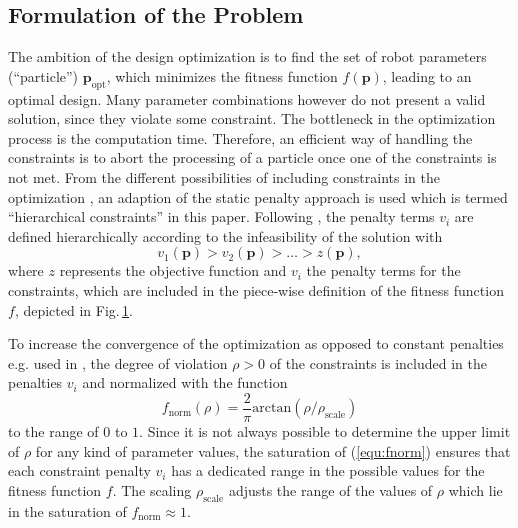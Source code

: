 \documentclass[fleqn,a4paper,10pt]{article}
\newcommand{\bm}[1]{\mathbf{#1}}
\begin{document}
\begin{multicols}{2}
\subsection{Formulation of the Problem}
\label{sec:opt_formulation}

\begin{figure}

\centering

\label{fig:uebersicht}
\end{figure}

The ambition of the design optimization is to find the set of robot parameters (``particle'') $\bm{p}_\mathrm{opt}$, which minimizes the fitness function $f(\bm{p})$, leading to an optimal design.
Many parameter combinations however do not present a valid solution, since they violate some constraint.
The bottleneck in the optimization process is the computation time.
Therefore, an efficient way of handling the constraints is to abort the processing of a particle once one of the constraints is not met.
From the different possibilities of including constraints in the optimization \cite{Jordehi2015}, an adaption of the static penalty approach is used which is termed  ``hierarchical constraints'' in this paper.
Following \cite{Ramirez2018}, the penalty terms $v_i$ are defined hierarchically according to the infeasibility of the solution with
%
\begin{equation}
v_1(\bm{p})>v_2(\bm{p})>\dots>z(\bm{p}),
\end{equation}
%
where $z$ represents the objective function and $v_i$ the penalty terms for the constraints, which are included in the piece-wise definition of the fitness function $f$, depicted in Fig.\,\ref{fig:uebersicht}.

To increase the convergence of the optimization as opposed to  constant penalties e.g. used in \cite{Ramirez2018}, the degree of violation $\rho>0$ of the constraints is included in the penalties $v_i$ and normalized with the function
%
\begin{equation}
f_\mathrm{norm}(\rho) = \frac{2}{\pi} \mathrm{arctan}(\rho / \rho_{\mathrm{scale}})
\label{equ:fnorm}
\end{equation}
%
to the range of $0$ to $1$.
Since it is not always possible to determine the upper limit of $\rho$ for any kind of parameter values, the saturation of (\ref{equ:fnorm}) ensures that each constraint penalty $v_i$ has a dedicated range in the possible values for the fitness function $f$.
The scaling $\rho_{\mathrm{scale}}$ adjusts the range of the values of $\rho$ which lie in the saturation of $f_\mathrm{norm} \approx 1$.



\end{multicols}
\end{document}
